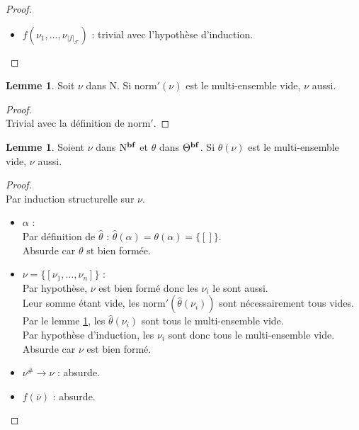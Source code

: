 \documentclass[a4paper]{report}
\newenvironment{preuve} 
	{\begin{proof}~\\} 
	{\end{proof}}
\theoremstyle{definition}
\newtheorem{lemme}[theoreme]{Lemme}
\newcommand{\mset}[1]{\{\![#1]\!\}}
\newcommand{\norm}{\mathrm{norm}}
\newcommand{\F}{\mathscr{F}}
\newcommand{\N}{\mathrm{N}}
\begin{document}
\begin{preuve}
\begin{itemize}[label={\textbf{Cas}}]
			\begin{itemize}[label={\textbf{Si}}]
				\item
					$\hat\theta (\nu) = {\nu^\#}' \rightarrow \nu'$ : \\
					$\hat\theta (\nu^\#)$ étant bien formé, ${\nu^\#}'$ est presque bien formé, $\nu'$ est bien formé et n'est pas une flèche. \\
					Par le lemme \ref{pbf_implique_msomme_pbf}, la somme de $\hat\theta (\nu^\#)$ et ${\nu^\#}'$ est presque bien formée. \\
					On en déduit le résultat attendu.
				\item
					non : trivial.
			\end{itemize}
		\item
			$f (\nu_1, \dots, \nu_{|f|_\F})$ : trivial avec l'hypothèse d'induction.
	\end{itemize}
\end{preuve}

\begin{lemme} \label{norm'_vide_implique_vide}
	Soit $\nu$ dans $\N$. Si $\norm' (\nu)$ est le multi-ensemble vide, $\nu$ aussi.
\end{lemme}

\begin{preuve}
	Trivial avec la définition de $\norm'$.
\end{preuve}

\begin{lemme} \label{bf_et_subst_vide_implique_vide}
	Soient $\nu$ dans $\N^{\bold{bf}}$ et $\theta$ dans $\Theta^{\bold{bf}}$. Si $\hat\theta (\nu)$ est le multi-ensemble vide, $\nu$ aussi.
\end{lemme}

\begin{preuve}
	Par induction structurelle sur $\nu$.
	\begin{itemize}[label={\textbf{Cas}}]
		\item
			$\alpha$ : \\
			Par définition de $\hat\theta$ : $\hat\theta (\alpha) = \theta (\alpha) = \mset{}$. \\
			Absurde car $\theta$ st bien formée.
		\item
			$\nu = \mset{\nu_1, \dots, \nu_n}$ : \\
			Par hypothèse, $\nu$ est bien formé donc les $\nu_i$ le sont aussi. \\
			Leur somme étant vide, les $\norm' (\hat\theta (\nu_i))$ sont nécessairement tous vides. \\
			Par le lemme \ref{bf_et_subst_vide_implique_vide}, les $\hat\theta (\nu_i)$ sont tous le multi-ensemble vide. \\
			Par hypothèse d'induction, les $\nu_i$ sont donc tous le multi-ensemble vide. \\
			Absurde car $\nu$ est bien formé.
		\item
			$\nu^\# \rightarrow \nu$ : absurde.
		\item
			$f (\overline \nu)$ : absurde.
	\end{itemize}
\end{preuve}
\end{document}
